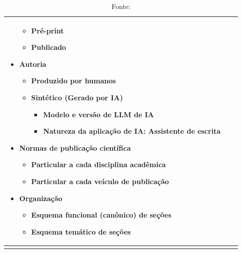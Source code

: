 \begin{longtable}[c]{ |p{8cm}|p{8cm}|p{8cm}| }
\begin{itemize}
        \begin{itemize}
            \item Pré-print
            \item Publicado
        \end{itemize}
        \item Autoria
        \begin{itemize}
            \item Produzido por humanos
            \item Sintético (Gerado por IA)
            \begin{itemize}
                \item Modelo e versão de LLM de IA
                \item Natureza da aplicação de IA: Assistente de escrita
            \end{itemize}
        \end{itemize}
        \item Normas de publicação científica
        \begin{itemize}
            \item Particular a cada disciplina acadêmica
            \item Particular a cada veículo de publicação
        \end{itemize}
        \item Organização
        \begin{itemize}
            \item Esquema funcional (canônico) de seções
            \item Esquema temático de seções
        \end{itemize}
    \end{itemize}
     &
    
     &
    
     \\ \hline
    \caption*{Fonte: \textcite{egbertDomainConsiderations2022}}
\end{longtable}

